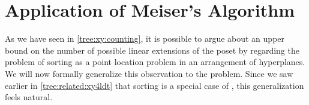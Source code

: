 \chapter{Application of Meiser's Algorithm}

As we have seen in \ref{tree:xy:counting}, it is possible to argue about an
upper bound on the number of possible linear extensions of the poset \XY by
regarding the problem of sorting \XY as a point location problem in an
arrangement of hyperplanes. We will now formally generalize this observation
to the \kSUM problem. Since we saw earlier in \ref{tree:related:xy4ldt} that
sorting \XY is a special case of \fourLDT, this generalization feels natural.

